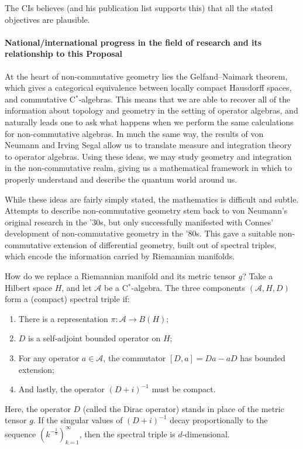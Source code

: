 \documentclass[12pt]{article}
\begin{document}
{\color{red} The CIs believes (and his publication list supports this)
that all the stated objectives are plausible.}


\paragraph*{National/international progress in the field of research and its relationship to this Proposal}

At the heart of non-commutative geometry lies the Gelfand--Naimark theorem,
which gives a categorical equivalence between locally compact Hausdorff spaces,
and commutative C$^*$-algebras.
This means that we are able to recover all of the information about topology and
geometry in the setting of operator algebras, and naturally leads one to ask
what happens when we perform the same calculations for non-commutative algebras.
In much the same way, the results of von Neumann and Irving Segal allow us to
translate measure and integration theory to operator algebras.
Using these ideas, we may study geometry and integration in the non-commutative
realm, giving us a mathematical framework in which to properly understand and
describe the quantum world around us.

While these ideas are fairly simply stated, the mathematics is difficult and
subtle.
Attempts to describe non-commutative geometry stem back to von Neumann's
original research in the '30s, but only successfully manifested with Connes'
development of non-commutative geometry in the '80s.
This gave a suitable non-commutative extension of differential geometry, built
out of spectral triples, which encode the information carried by Riemannian 
manifolds.

How do we replace a Riemannian manifold and its metric tensor $g$?
Take a Hilbert space $H$, and let $\mathcal A$ be a C$^*$-algebra.
The three components $(\mathcal A,H,D)$ form a (compact) spectral triple if:
\begin{enumerate}
	\item There is a representation $\pi:\mathcal A\to B(H)$;
	\item $D$ is a self-adjoint bounded operator on $H$;
	\item For any operator $a\in\mathcal A$, the commutator
		$[D,a]=Da-aD$ has bounded extension;
	\item And lastly, the operator $(D+i)^{-1}$ must be compact.
\end{enumerate}
Here, the operator $D$ (called the Dirac operator) stands in place of the metric
tensor $g$.
If the singular values of $(D+i)^{-1}$ decay proportionally to the sequence
$(k^{-\frac{1}{d}})_{k=1}^{\infty}$, then the spectral triple is $d$-dimensional.
\end{document}
